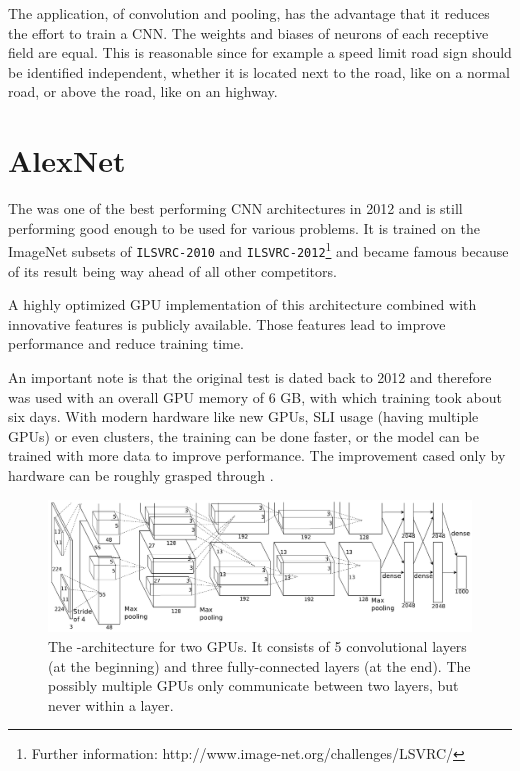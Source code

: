 The application, of convolution and pooling, has the advantage that it reduces the effort to train a CNN. The weights and biases of neurons of each receptive field are equal. This is reasonable since for example a speed limit road sign should be identified independent, whether it is located next to the road, like on a normal road, or above the road, like on an highway. \cite{lecun2015lenet}


\section{AlexNet} \label{sec: AlexNet}

The \textit{\alexnet} was one of the best performing CNN architectures in 2012 and is still performing good enough to be used for various problems. It is trained on the ImageNet subsets of \texttt{ILSVRC-2010} and \texttt{ILSVRC-2012}\footnote{Further information: http://www.image-net.org/challenges/LSVRC/} and became famous because of its result being way ahead of all other competitors.

A highly optimized GPU implementation of this architecture combined with innovative features is publicly available. Those features lead to improve performance and reduce training time.\cite{krizhevsky2012imagenet}

An important note is that the original test is dated back to 2012 and therefore was used with an overall GPU memory of 6 GB, with which training took about six days. With modern hardware like new GPUs, SLI usage (having multiple GPUs) or even clusters, the training can be done faster, or the model can be trained with more data to improve performance. The improvement cased only by hardware can be roughly grasped through \cite{sze2017hardware}.


\begin{figure}[ht]
	\centering
	\includegraphics[scale = 0.45]{src/pic/AlexNet-structure.PNG}
	\caption{The \alexnet-architecture for two GPUs. It consists of 5 convolutional layers (at the beginning) and three fully-connected layers (at the end). The possibly multiple GPUs only communicate between two layers, but never within a layer.\cite{krizhevsky2012imagenet}}
	\label{pic: AlexNet}
\end{figure}